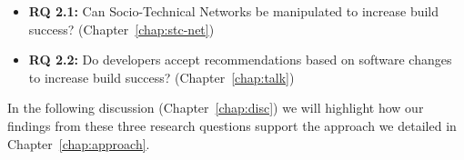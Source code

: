 \begin{itemize}
  \item\textbf{RQ 2.1:} Can Socio-Technical Networks be manipulated to increase build success? (Chapter~\ref{chap:stc-net})
  \item\textbf{RQ 2.2:} Do developers accept recommendations based on software changes to increase build success? (Chapter~\ref{chap:talk})
\end{itemize}

In the following discussion (Chapter~\ref{chap:disc}) we will highlight how our findings from these three research questions support the approach we detailed in Chapter~\ref{chap:approach}.









